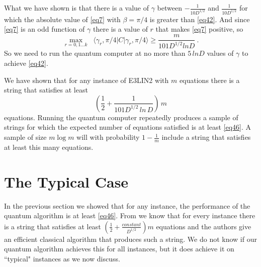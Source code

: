 \documentclass[t11pt,preprint,preprintnumbers]{revtex4}
\begin{document}
What we have shown is that there is a value of $\gamma$ between $-\frac{1}{10 D^{1/2}}$ and $\frac{1}{10 D^{1/2}}$ for which the absolute value of \eqref{eq7} with $\beta = \pi / 4$ is greater than \eqref{eq42}. And since \eqref{eq7} is an odd function of $\gamma$ there is a value of $r$ that makes \eqref{eq7} positive, so
\begin{equation}\label{eq43}
 \max\limits_{r = 0,1\ldots k}   \; \; \langle \gamma_r, \pi/4 | C | \gamma_r,  \pi/4 \rangle \geqslant \frac{m}{101 D^{1/2}  l n  D}\ .
\end{equation}
So we need to run the quantum computer at no more than $5 \, ln D$ values of $\gamma$ to achieve \eqref{eq42}.
 
We have shown that for any instance of E3LIN2 with $m$ equations there is a string that satisfies at least
 \begin{equation}\label{eq46}
\left( 
\frac{1}{2} + \frac{1}{101 D^{1/2}\, ln\, D}
\right)\, m
\end{equation}
equations. Running the quantum computer repeatedly produces a sample of strings for which the expected number of equations satisfied is at least \eqref{eq46}. A sample of size $m \log m$ will with probability $1 -\frac{1}{m}$ include a string that satisfies at least this many equations.

 \section{The Typical Case}
 In the previous section we showed that for any instance, the performance of the quantum algorithm is  at least \eqref{eq46}. From \cite{Boaz-2015} we know that for every instance there is a string that satisfies at least $\left(\frac{1}{2} + \frac{constant}{D^{1/2}}\right) m$ equations and the authors give an efficient classical algorithm that produces such a string. We do not know if our quantum algorithm achieves this for all instances, but it does achieve it on ``typical" instances as we now discuss.
 
\end{document}
